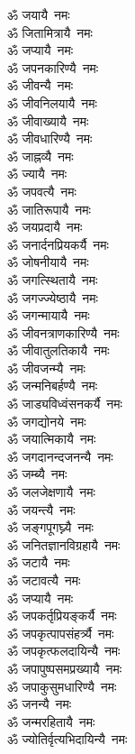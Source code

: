 \begin{flushleft}
\begin{multicols}{2}
ॐ जयायै~नमः\\
ॐ जितामित्रायै~नमः\\
ॐ जप्यायै~नमः\\
ॐ जपनकारिण्यै~नमः\\
ॐ जीवन्यै~नमः\\
ॐ जीवनिलयायै~नमः\hfill{}\\
ॐ जीवाख्यायै~नमः\\
ॐ जीवधारिण्यै~नमः\\
ॐ जाह्नव्यै~नमः\\
ॐ ज्यायै~नमः\\
ॐ जपवत्यै~नमः\\
ॐ जातिरूपायै~नमः\\
ॐ जयप्रदायै~नमः\\
ॐ जनार्दनप्रियकर्यै~नमः\\
ॐ जोषनीयायै~नमः\\
ॐ जगत्स्थितायै~नमः\hfill{}\\
ॐ जगज्ज्येष्ठायै~नमः\\
ॐ जगन्मायायै~नमः\\
ॐ जीवनत्राणकारिण्यै~नमः\\
ॐ जीवातुलतिकायै~नमः\\
ॐ जीवजन्म्यै~नमः\\
ॐ जन्मनिबर्हण्यै~नमः\\
ॐ जाड्यविध्वंसनकर्यै~नमः\\
ॐ जगद्योनये~नमः\\
ॐ जयात्मिकायै~नमः\\
ॐ जगदानन्दजनन्यै~नमः\hfill{}\\
ॐ जम्ब्यै~नमः\\
ॐ जलजेक्षणायै~नमः\\
ॐ जयन्त्यै~नमः\\
ॐ जङ्गपूगघ्न्यै~नमः\\
ॐ जनितज्ञानविग्रहायै~नमः\\
ॐ जटायै~नमः\\
ॐ जटावत्यै~नमः\\
ॐ जप्यायै~नमः\\
ॐ जपकर्तृप्रियङ्कर्यै~नमः\\
ॐ जपकृत्पापसंहर्त्र्यै~नमः\hfill{}\\
ॐ जपकृत्फलदायिन्यै~नमः\\
ॐ जपापुष्पसमप्रख्यायै~नमः\\
ॐ जपाकुसुमधारिण्यै~नमः\\
ॐ जनन्यै~नमः\\
ॐ जन्मरहितायै~नमः\\
ॐ ज्योतिर्वृत्यभिदायिन्यै~नमः\\

\end{multicols}
\end{flushleft}
